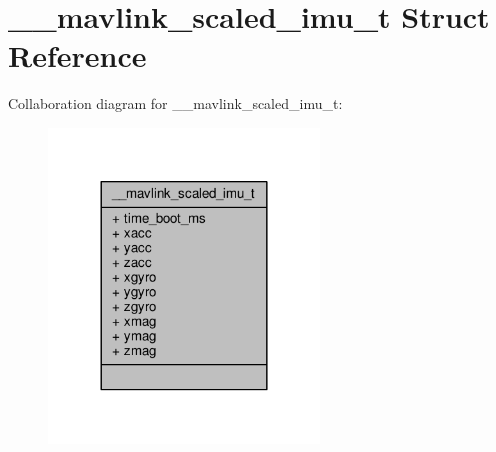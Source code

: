 \hypertarget{struct____mavlink__scaled__imu__t}{\section{\+\_\+\+\_\+mavlink\+\_\+scaled\+\_\+imu\+\_\+t Struct Reference}
\label{struct____mavlink__scaled__imu__t}
}


Collaboration diagram for \+\_\+\+\_\+mavlink\+\_\+scaled\+\_\+imu\+\_\+t\+:
\nopagebreak
\begin{figure}[H]
\begin{center}
\leavevmode
\includegraphics[width=204pt]{struct____mavlink__scaled__imu__t__coll__graph}
\end{center}
\end{figure}
